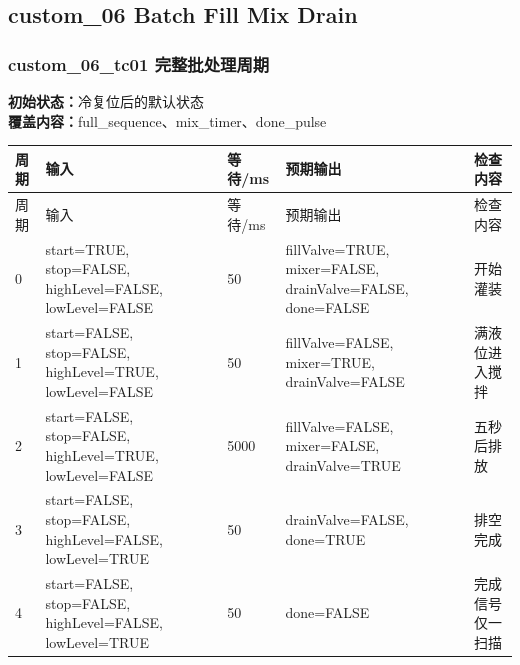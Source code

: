 \subsection{{\ttfamily custom\_06} Batch Fill Mix Drain}

\subsubsection{{\ttfamily custom\_06\_tc01} 完整批处理周期}

\noindent\textbf{初始状态：}冷复位后的默认状态\\

\textbf{覆盖内容：}full\_sequence、mix\_timer、done\_pulse

\begin{longtable}{L{1.0cm}L{4.7cm}L{1.4cm}L{4.0cm}L{2.1cm}}

\toprule

周期 & 输入 & 等待/ms & 预期输出 & 检查内容\\

\midrule

\endfirsthead

\toprule

周期 & 输入 & 等待/ms & 预期输出 & 检查内容\\

\midrule

\endhead

0 & start=TRUE, stop=FALSE, highLevel=FALSE, lowLevel=FALSE & 50 & fillValve=TRUE, mixer=FALSE, drainValve=FALSE, done=FALSE & 开始灌装\\

1 & start=FALSE, stop=FALSE, highLevel=TRUE, lowLevel=FALSE & 50 & fillValve=FALSE, mixer=TRUE, drainValve=FALSE & 满液位进入搅拌\\

2 & start=FALSE, stop=FALSE, highLevel=TRUE, lowLevel=FALSE & 5000 & fillValve=FALSE, mixer=FALSE, drainValve=TRUE & 五秒后排放\\

3 & start=FALSE, stop=FALSE, highLevel=FALSE, lowLevel=TRUE & 50 & drainValve=FALSE, done=TRUE & 排空完成\\

4 & start=FALSE, stop=FALSE, highLevel=FALSE, lowLevel=TRUE & 50 & done=FALSE & 完成信号仅一扫描\\

\bottomrule

\end{longtable}

